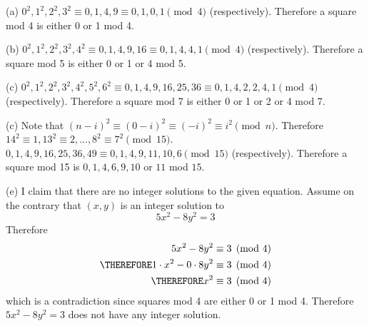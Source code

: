 
(a) $0^2, 1^2, 2^2, 3^2 \equiv 0, 1, 4, 9 \equiv 0, 1, 0, 1 \pmod{4}$
(respectively).
Therefore a square mod 4 is either 0 or 1 mod 4.

(b)
$0^2, 1^2, 2^2, 3^2, 4^2 \equiv 0, 1, 4, 9, 16 \equiv 0, 1, 4, 4, 1 \pmod{4}$
(respectively).
Therefore a square mod 5 is either 0 or 1 or 4 mod 5.

(c)
$0^2, 1^2, 2^2, 3^2, 4^2, 5^2, 6^2 \equiv 0, 1, 4, 9, 16, 25, 36 \equiv 0, 1, 4, 2, 2, 4, 1 \pmod{4}$ (respectively).
Therefore a square mod 7 is either 0 or 1 or 2 or 4 mod 7.

(c)
Note that $(n - i)^2 \equiv (0 - i)^2 \equiv (-i)^2 \equiv i^2 \pmod{n}$.
Therefore $14^2 \equiv 1, 13^2 \equiv 2, ..., 8^2 \equiv 7^2 \pmod{15}$.
$0, 1, 4, 9, 16, 25, 36, 49 \equiv 0, 1, 4, 9, 11, 10, 6 \pmod{15}$ (respectively).
Therefore a square mod 15 is $0, 1, 4, 6, 9, 10$ or $11$ mod $15$.

(e)
I claim that there are no integer solutions to the given equation.
Assume on the contrary that $(x,y)$ is an integer solution to
\[
      5x^2 - 8y^2 = 3
\]
Therefore
\begin{align*}
      5x^2 - 8y^2 &\equiv 3 \pmod{4} \\
      \THEREFORE 1 \cdot x^2 - 0 \cdot 8y^2 &\equiv 3 \pmod{4} \\
      \THEREFORE x^2 &\equiv 3 \pmod{4}
\end{align*}   
which is a contradiction since squares mod 4 are either 0 or 1 mod 4.
Therefore
$5x^2 - 8y^2 = 3$ does not have any integer solution.

